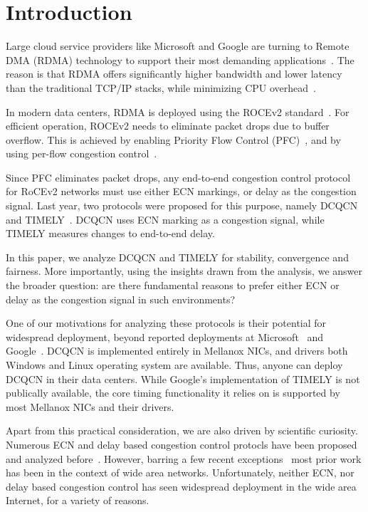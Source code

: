 \section{Introduction}

Large cloud service providers like Microsoft and Google are turning to Remote
DMA (RDMA) technology to support their most demanding
applications~\cite{dcqcn,timely,tcp-bolt,erasure-storage,farm,pilaf}.  The
reason is that RDMA offers significantly higher bandwidth and lower latency than
the traditional TCP/IP stacks, while minimizing CPU
overhead~\cite{dcqcn,farm,timely}. 

In modern data centers, RDMA is deployed using the ROCEv2 standard~\cite{rocev2}.
For efficient operation, ROCEv2 needs to eliminate packet drops due to buffer
overflow. This is achieved by enabling Priority Flow Control (PFC)~\cite{pfc},
and by using per-flow congestion control~\cite{dcqcn,timely}. 

Since PFC eliminates packet drops, any end-to-end congestion control protocol
for RoCEv2 networks must use either ECN markings, or delay as the congestion
signal. Last year, two protocols were proposed for this purpose, namely
DCQCN~\cite{dcqcn} and TIMELY~\cite{timely}. DCQCN uses ECN marking as a
congestion signal, while TIMELY measures changes to end-to-end delay.


In this paper, we analyze DCQCN and TIMELY for stability, convergence and
fairness. More importantly, using the insights drawn from the analysis, we
answer the broader question: are there fundamental reasons to prefer either ECN
or delay as the congestion signal in such environments?


One of our motivations for analyzing these protocols is their potential for
widespread deployment, beyond reported deployments at Microsoft~\cite{dcqcn} and
Google~\cite{timely}. DCQCN is implemented entirely in Mellanox NICs, and
drivers both Windows and Linux operating system are available. Thus, anyone can
deploy DCQCN in their data centers. While Google's implementation of TIMELY is
not publically available, the core timing functionality it relies on is
supported by most Mellanox NICs and their drivers. 

Apart from this practical consideration, we are also driven by
scientific curiosity. Numerous ECN and delay based congestion control protocls
have been proposed and analyzed before~\cite{ecn, tcp-vegas,
Hollot:PIController,misra2000fluid,hollot2001designing,misra:TAC2002,gorinsky2004feedback}.
However, barring a few recent exceptions~\cite{dctcp-analysis, qcn-analysis}
most prior work has been in the context of wide area networks.  Unfortunately,
neither ECN, nor delay based congestion control has seen widespread
deployment in the wide area Internet, for a variety of reasons. 

